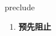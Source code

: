 
\begin{frame}
{\huge preclude}
\begin{center}
\begin{enumerate}\Large
  \item \textbf{预先阻止}
\end{enumerate}
\end{center}
\end{frame}
